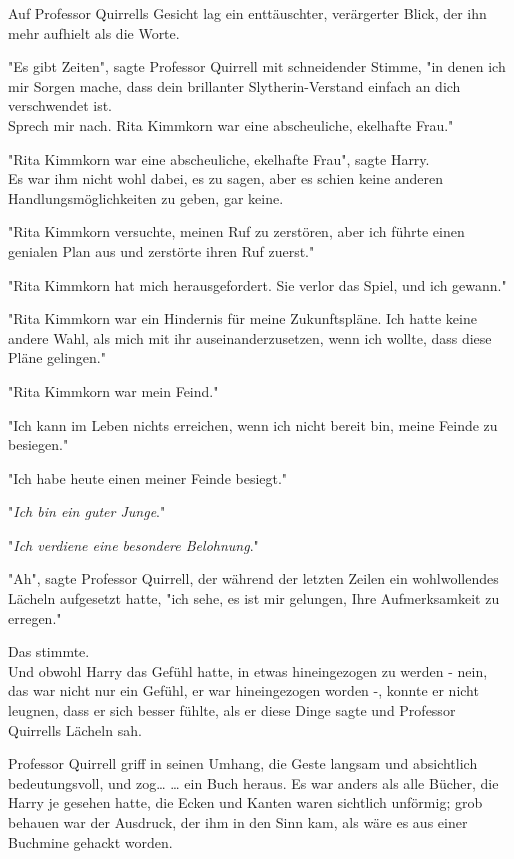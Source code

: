 {Auf Professor Quirrells Gesicht lag ein enttäuschter, verärgerter Blick, der ihn mehr aufhielt als die Worte.

"Es gibt Zeiten", sagte Professor Quirrell mit schneidender Stimme, "in denen ich mir Sorgen mache, dass dein brillanter Slytherin-Verstand einfach an dich verschwendet ist.\\ Sprech mir nach. Rita Kimmkorn war eine abscheuliche, ekelhafte Frau."

"Rita Kimmkorn war eine abscheuliche, ekelhafte Frau", sagte Harry.\\ Es war ihm nicht wohl dabei, es zu sagen, aber es schien keine anderen Handlungsmöglichkeiten zu geben, gar keine.

"Rita Kimmkorn versuchte, meinen Ruf zu zerstören, aber ich führte einen genialen Plan aus und zerstörte ihren Ruf zuerst."

"Rita Kimmkorn hat mich herausgefordert. Sie verlor das Spiel, und ich gewann."

"Rita Kimmkorn war ein Hindernis für meine Zukunftspläne. Ich hatte keine andere Wahl, als mich mit ihr auseinanderzusetzen, wenn ich wollte, dass diese Pläne gelingen."

"Rita Kimmkorn war mein Feind."

"Ich kann im Leben nichts erreichen, wenn ich nicht bereit bin, meine Feinde zu besiegen."

"Ich habe heute einen meiner Feinde besiegt."

"\emph{Ich bin ein guter Junge}."

"\emph{Ich verdiene eine besondere Belohnung}."

"Ah", sagte Professor Quirrell, der während der letzten Zeilen ein wohlwollendes Lächeln aufgesetzt hatte, "ich sehe, es ist mir gelungen, Ihre Aufmerksamkeit zu erregen."

Das stimmte.\\ Und obwohl Harry das Gefühl hatte, in etwas hineingezogen zu werden - nein, das war nicht nur ein Gefühl, er war hineingezogen worden -, konnte er nicht leugnen, dass er sich besser fühlte, als er diese Dinge sagte und Professor Quirrells Lächeln sah.

Professor Quirrell griff in seinen Umhang, die Geste langsam und absichtlich bedeutungsvoll, und zog… … ein Buch heraus. Es war anders als alle Bücher, die Harry je gesehen hatte, die Ecken und Kanten waren sichtlich unförmig; grob behauen war der Ausdruck, der ihm in den Sinn kam, als wäre es aus einer Buchmine gehackt worden.

}
